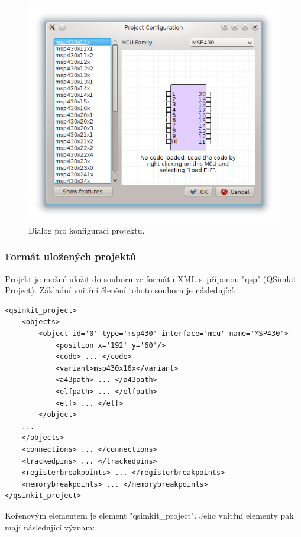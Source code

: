\begin{figure}[ht]
\centering
\includegraphics[trim=0cm 0cm 0cm 0cm, scale=0.7]{fig/projectconf}
\caption{Dialog pro konfiguraci projektu.}
\label{fig:projectconf}
\end{figure}

\subsubsection{Formát uložených projektů}

Projekt je možné uložit do souboru ve formátu XML s~příponou "qsp" (QSimkit Project). Základní vnitřní členění tohoto souboru je následující:

\lstset{language=XML, numbers=left, frame=single, breaklines=true, tabsize=2, xleftmargin=20pt}
\begin{lstlisting}
<qsimkit_project>
	<objects>
		<object id='0' type='msp430' interface='mcu' name='MSP430'>
			<position x='192' y='60'/>
			<code> ... </code>
			<variant>msp430x16x</variant>
			<a43path> ... </a43path>
			<elfpath> ... </elfpath>
			<elf> ... </elf>
		</object>
	...
	</objects>
	<connections> ... </connections>
	<trackedpins> ... </trackedpins>
	<registerbreakpoints> ... </registerbreakpoints>
	<memorybreakpoints> ... </memorybreakpoints>
</qsimkit_project>
\end{lstlisting}

Kořenovým elementem je element "qsimkit\_project". Jeho vnitřní elementy pak mají následující význam:

